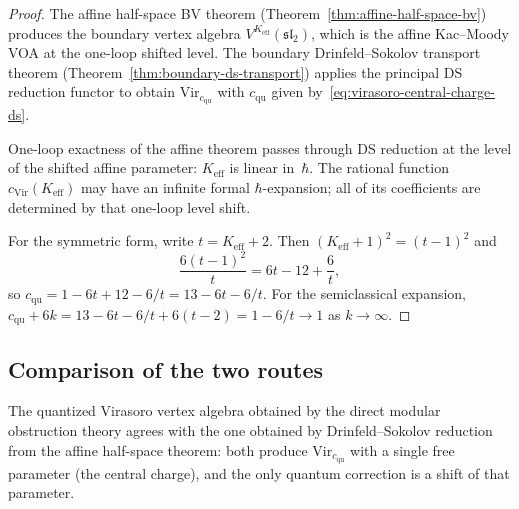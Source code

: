 \begin{proof}
The affine half-space BV theorem
(Theorem~\ref{thm:affine-half-space-bv}) produces the boundary
vertex algebra $V^{K_{\mathrm{eff}}}(\mathfrak{sl}_2)$, which is the
affine Kac--Moody VOA at the one-loop shifted level. The boundary
Drinfeld--Sokolov transport theorem
(Theorem~\ref{thm:boundary-ds-transport}) applies the principal DS
reduction functor to obtain $\mathrm{Vir}_{c_{\mathrm{qu}}}$ with
$c_{\mathrm{qu}}$ given by~\eqref{eq:virasoro-central-charge-ds}.

One-loop exactness of the affine theorem passes through DS reduction
at the level of the shifted affine parameter: $K_{\mathrm{eff}}$ is
linear in~$\hbar$. The rational function
$c_{\mathrm{Vir}}(K_{\mathrm{eff}})$ may have an infinite formal
$\hbar$-expansion; all of its coefficients are determined by that
one-loop level shift.

For the symmetric form, write $t = K_{\mathrm{eff}} + 2$. Then
$(K_{\mathrm{eff}}+1)^2 = (t-1)^2$ and
\[
\frac{6(t-1)^2}{t} = 6t - 12 + \frac{6}{t},
\]
so $c_{\mathrm{qu}} = 1 - 6t + 12 - 6/t = 13 - 6t - 6/t$. For the
semiclassical expansion, $c_{\mathrm{qu}} + 6k
= 13 - 6t - 6/t + 6(t-2) = 1 - 6/t \to 1$ as $k\to\infty$.
\end{proof}

\subsection{Comparison of the two routes}
\label{subsec:virasoro-comparison}

\begin{theorem}
\label{thm:virasoro-consistency}
The quantized Virasoro vertex algebra obtained by the direct modular
obstruction theory agrees with the one obtained by Drinfeld--Sokolov
reduction from the affine half-space theorem: both produce
$\mathrm{Vir}_{c_{\mathrm{qu}}}$ with a single free parameter
(the central charge), and the only quantum correction is a shift of that
parameter.
\end{theorem}

